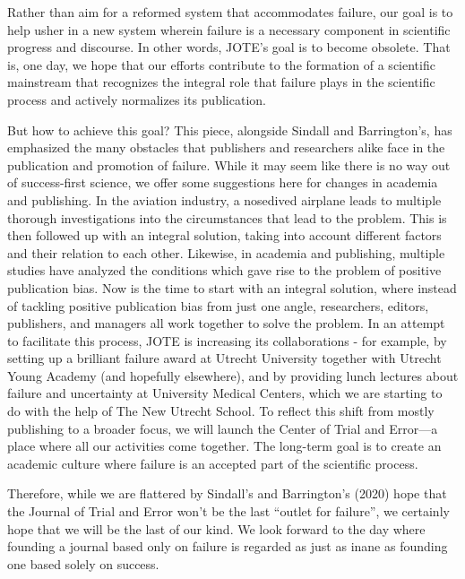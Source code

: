 \documentclass[empirical, author-date]{jote-article}
\begin{document}
Rather than aim for a reformed system that accommodates failure, our goal is to help usher in a new system wherein failure is a necessary component in scientific progress and discourse. In other words, JOTE's goal is to become obsolete. That is, one day, we hope that our efforts contribute to the formation of a scientific mainstream that recognizes the integral role that failure plays in the scientific process and actively normalizes its publication. 

But how to achieve this goal? This piece, alongside Sindall and Barrington's, has emphasized the many obstacles that publishers and researchers alike face in the publication and promotion of failure. While it may seem like there is no way out of success-first science, we offer some suggestions here for changes in academia and publishing. In the aviation industry, a nosedived airplane leads to multiple thorough investigations into the circumstances that lead to the problem. This is then followed up with an integral solution, taking into account different factors and their relation to each other. Likewise, in academia and publishing, multiple studies have analyzed the conditions which gave rise to the problem of positive publication bias. Now is the time to start with an integral solution, where instead of tackling positive publication bias from just one angle, researchers, editors, publishers, and managers all work together to solve the problem. In an attempt to facilitate this process, JOTE is increasing its collaborations - for example, by setting up a brilliant failure award at Utrecht University together with Utrecht Young Academy (and hopefully elsewhere), and by providing lunch lectures about failure and uncertainty at University Medical Centers, which we are starting to do with the help of The New Utrecht School. To reflect this shift from mostly publishing to a broader focus, we will launch the Center of Trial and Error—a place where all our activities come together. The long-term goal is to create an academic culture where failure is an accepted part of the scientific process. 

Therefore, while we are flattered by Sindall's and Barrington's (2020) hope that the Journal of Trial and Error won't be the last “outlet for failure”, we certainly hope that we will be the last of our kind. We look forward to the day where founding a journal based only on failure is regarded as just as inane as founding one based solely on success. 

\section{}
\end{document}
